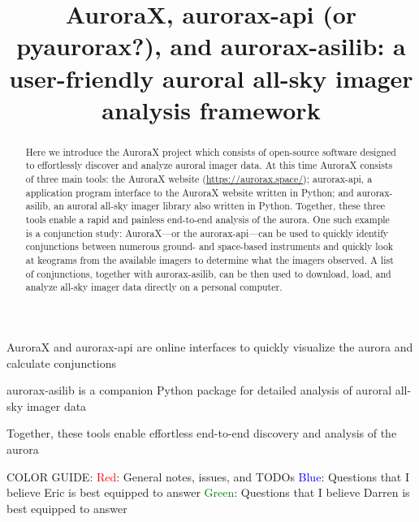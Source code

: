 \documentclass[draft]{agujournal2019}
\begin{document}
\title{AuroraX, aurorax-api (or pyaurorax?), and aurorax-asilib: a user-friendly auroral all-sky imager analysis framework}





\begin{keypoints}
\item AuroraX and aurorax-api are online interfaces to quickly visualize the aurora and calculate conjunctions
\item aurorax-asilib is a companion Python package for detailed analysis of auroral all-sky imager data 
\item Together, these tools enable effortless end-to-end discovery and analysis of the aurora
\end{keypoints}

COLOR GUIDE: \newline
\textcolor{red}{Red}: General notes, issues, and TODOs \newline
\textcolor{blue}{Blue}: Questions that I believe Eric is best equipped to answer \newline
\textcolor{green}{Green}: Questions that I believe Darren is best equipped to answer

\begin{abstract}
Here we introduce the AuroraX project which consists of open-source software designed to effortlessly discover and analyze auroral imager data. At this time AuroraX consists of three main tools: the AuroraX website (\url{https://aurorax.space/}); aurorax-api, a application program interface to the AuroraX website written in Python; and aurorax-asilib, an auroral all-sky imager library also written in Python. Together, these three tools enable a rapid and painless end-to-end analysis of the aurora. One such example is a conjunction study: AuroraX---or the aurorax-api---can be used to quickly identify conjunctions between numerous ground- and space-based instruments and quickly look at keograms from the available imagers to determine what the imagers observed. A list of conjunctions, together with aurorax-asilib, can be then used to download, load, and analyze all-sky imager data directly on a personal computer.
\end{abstract}
\end{document}
